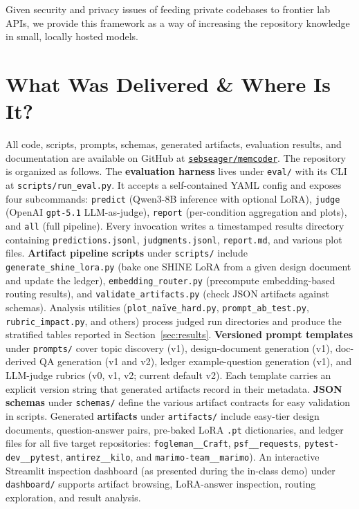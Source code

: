 \documentclass[conference,10.5pt]{IEEEtran}
\begin{document}
Given security and privacy issues of feeding private codebases to frontier lab APIs, we provide this framework as a way of increasing the repository knowledge in small, locally hosted models.
\section{What Was Delivered \& Where Is It?}

All code, scripts, prompts, schemas, generated artifacts, evaluation
results, and documentation are available on GitHub at
\href{https://github.com/sebseager/memcoder}{\texttt{sebseager/memcoder}}.
The repository is organized as follows.
The \textbf{evaluation harness} lives under \texttt{eval/} with 
its CLI at \texttt{scripts/run\_eval.py}.  It accepts a
self-contained YAML config and exposes four subcommands:
\texttt{predict} (Qwen3-8B inference with optional LoRA), \texttt{judge}
(OpenAI \texttt{gpt-5.1} LLM-as-judge), \texttt{report} (per-condition
aggregation and plots), and \texttt{all} (full pipeline).  Every
invocation writes a timestamped results directory containing 
\texttt{predictions.jsonl}, \texttt{judgments.jsonl},
\texttt{report.md}, and various plot files.
\textbf{Artifact pipeline scripts} under \texttt{scripts/} include
\texttt{generate\_shine\_lora.py} (bake one SHINE LoRA from a given 
design document and update the ledger), \texttt{embedding\_router.py}
(precompute embedding-based routing results), and
\texttt{validate\_artifacts.py} (check JSON artifacts against schemas).
Analysis utilities (\texttt{plot\_naïve\_hard.py},
\texttt{prompt\_ab\_test.py}, \texttt{rubric\_impact.py}, and others)
process judged run directories and produce the stratified tables reported
in Section~\ref{sec:results}.
\textbf{Versioned prompt templates} under \texttt{prompts/} cover topic
discovery (v1), design-document generation (v1), doc-derived QA
generation (v1 and v2), ledger example-question generation (v1), and
LLM-judge rubrics (v0, v1, v2; current default v2).  Each template
carries an explicit version string that generated artifacts record in
their metadata.
\textbf{JSON schemas} under \texttt{schemas/} define the various 
artifact contracts for easy validation in scripts.
Generated \textbf{artifacts} under \texttt{artifacts/} include
easy-tier design documents, question-answer pairs, pre-baked LoRA \texttt{.pt}
dictionaries, and ledger files for all five target repositories: \texttt{fogleman\_\_Craft},
\texttt{psf\_\_requests}, \texttt{pytest-dev\_\_pytest},
\texttt{antirez\_\_kilo}, and \texttt{marimo-team\_\_marimo}).
An interactive Streamlit inspection dashboard (as presented during the 
in-class demo) under \texttt{dashboard/} supports artifact browsing, 
LoRA-answer inspection, routing exploration, and result analysis.
\end{document}
